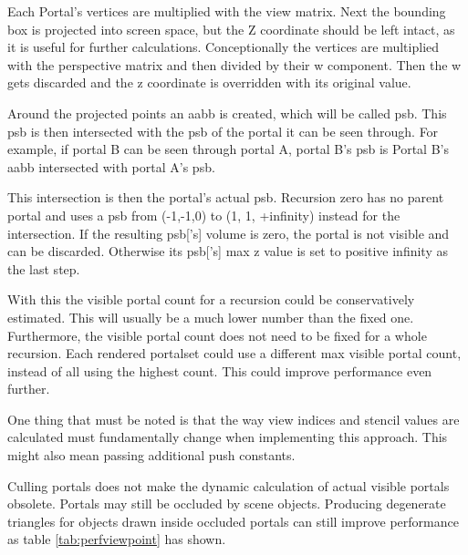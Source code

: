 Each Portal's vertices are multiplied with the view matrix. Next the bounding box is projected into screen space, but the Z coordinate should be left intact, as it is useful for further calculations. Conceptionally the vertices are multiplied with the perspective matrix and then divided by their w component. Then the w gets discarded and the z coordinate is overridden with its original value.

Around the projected points an \gls{aabb} is created, which will be called \gls{psb}. This \gls{psb} is then intersected with the \gls{psb} of the portal it can be seen through. For example, if portal B can be seen through portal A, portal B's \gls{psb} is Portal B's \gls{aabb} intersected with portal A's \gls{psb}.

This intersection is then the portal's actual \gls{psb}. Recursion zero has no parent portal and uses a \gls{psb} from (-1,-1,0) to (1, 1, +infinity) instead for the intersection. If the resulting \gls{psb}['s] volume is zero, the portal is not visible and can be discarded. Otherwise its \gls{psb}['s] max z value is set to positive infinity as the last step.




With this the visible portal count for a recursion could be conservatively estimated. This will usually be a much lower number than the fixed one.  Furthermore, the visible portal count does not need to be fixed for a whole recursion. Each rendered \gls{portalset} could use a different max visible portal count, instead of all using the highest count. This could improve performance even further.

One thing that must be noted is that the way view indices and stencil values are calculated must fundamentally change when implementing this approach. This might also mean passing additional push constants.

Culling portals does not make the dynamic calculation of actual visible portals obsolete. Portals may still be occluded by scene objects. Producing degenerate triangles for objects drawn inside occluded portals can still improve performance as table \ref{tab:perfviewpoint} has shown.

